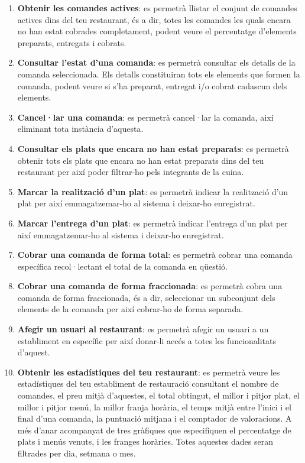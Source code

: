 \begin{enumerate}
\item \textbf{Obtenir les comandes actives}: es permetrà llistar el conjunt de comandes actives dins del teu restaurant, és a dir, totes les comandes les quals encara no han estat cobrades completament, podent veure el percentatge d'elements preparats, entregats i cobrats.
\item \textbf{Consultar l'estat d'una comanda}: es permetrà consultar els detalls de la comanda seleccionada. Els detalls constituiran tots els elements que formen la comanda, podent veure si s'ha preparat, entregat i/o cobrat cadascun dels elements.
\item \textbf{Cancel·lar una comanda}: es permetrà cancel·lar la comanda, així eliminant tota instància d'aquesta.
\item \textbf{Consultar els plats que encara no han estat preparats}: es permetrà obtenir tots els plats que encara no han estat preparats dins del teu restaurant per així poder filtrar-ho pels integrants de la cuina.
\item \textbf{Marcar la realització d'un plat}: es permetrà indicar la realització d'un plat per així emmagatzemar-ho al sistema i deixar-ho enregistrat.
\item \textbf{Marcar l'entrega d'un plat}: es permetrà indicar l'entrega d'un plat per així emmagatzemar-ho al sistema i deixar-ho enregistrat.
\item \textbf{Cobrar una comanda de forma total}: es permetrà cobrar una comanda específica recol·lectant el total de la comanda en qüestió.
\item \textbf{Cobrar una comanda de forma fraccionada}: es permetrà cobra una comanda de forma fraccionada, és a dir, seleccionar un subconjunt dels elements de la comanda per així cobrar-ho de forma separada.
\item \textbf{Afegir un usuari al restaurant}: es permetrà afegir un usuari a un establiment en específic per així donar-li accés a totes les funcionalitats d'aquest.
\item \textbf{Obtenir les estadístiques del teu restaurant}: es permetrà veure les estadístiques del teu establiment de restauració consultant el nombre de comandes, el preu mitjà d'aquestes, el total obtingut, el millor i pitjor plat, el millor i pitjor menú, la millor franja horària, el temps mitjà entre l'inici i el final d'una comanda, la puntuació mitjana i el comptador de valoracions. A més d'anar acompanyat de tres gràfiques que especifiquen el percentatge de plats i menús venuts, i les franges horàries. Totes aquestes dades seran filtrades per dia, setmana o mes.

\end{enumerate}
